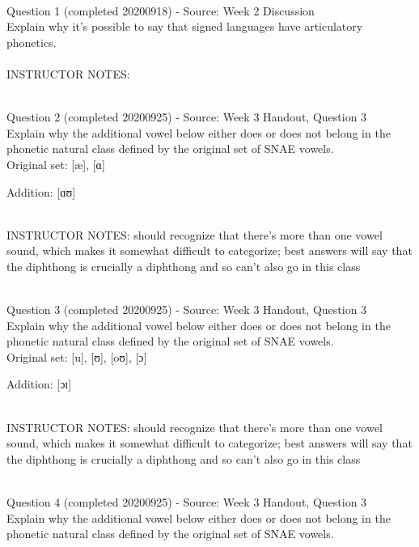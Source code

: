 \documentclass[12pt]{article}
\begin{document}
~\\

{\large Question 1} (completed 20200918) - Source: Week 2 Discussion\\

Explain why it's possible to say that signed languages have articulatory phonetics.\\


~\\
INSTRUCTOR NOTES: 


~\\

{\large Question 2} (completed 20200925) - Source: Week 3 Handout, Question 3\\

Explain why the additional vowel below either does or does not belong in the phonetic natural class defined by the original set of SNAE vowels.\\

Original set: {[æ]}, {[ɑ]}

Addition: {[ɑʊ]}


~\\
INSTRUCTOR NOTES: should recognize that there's more than one vowel sound, which makes it somewhat difficult to categorize; best answers will say that the diphthong is crucially a diphthong and so can't also go in this class


~\\

{\large Question 3} (completed 20200925) - Source: Week 3 Handout, Question 3\\

Explain why the additional vowel below either does or does not belong in the phonetic natural class defined by the original set of SNAE vowels.\\

Original set: {[u]}, {[ʊ]}, {[oʊ]}, {[ɔ]}

Addition: {[ɔɪ]}


~\\
INSTRUCTOR NOTES: should recognize that there's more than one vowel sound, which makes it somewhat difficult to categorize; best answers will say that the diphthong is crucially a diphthong and so can't also go in this class


~\\

{\large Question 4} (completed 20200925) - Source: Week 3 Handout, Question 3\\

Explain why the additional vowel below either does or does not belong in the phonetic natural class defined by the original set of SNAE vowels.\\
\end{document}
